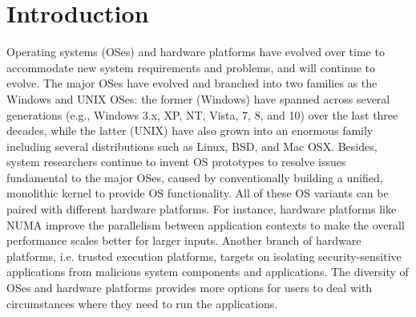 \chapter{Introduction}
\label{chap:intro}

\begin{comment}
Motivation:
-- A working operating system requires compatible applications to perform the operations demanded by the users.
-- The compatibility between an application and its operating system is determined by whether the required OS abstractions are faithfully supported.
-- In modern operating systems, applications can rely on plenty abstractions that exclusively belong to certain operating systems, thus the applications become hard to reuse on other platforms.
-- Application reuse is valuable for saving the cost of porting the demanded applications, especially on emerging, experimental operating systems. 
\end{comment}

Operating systems (OSes) and hardware platforms have evolved over time to accommodate new system requirements and problems, and will continue to evolve.
The major OSes have evolved and branched into two families as the Windows and UNIX OSes:
the former (Windows) have spanned across several generations
(e.g., Windows 3.x, XP, NT, Vista, 7, 8, and 10) over the last three decades,
while the latter (UNIX) have also grown into an enormous family including several distributions such as Linux, BSD, and Mac OSX.
Besides, system researchers continue to invent OS prototypes
to resolve issues fundamental to the major OSes, caused by conventionally building a unified, monolithic kernel to provide OS functionality.
All of these OS variants can be paired with different hardware platforms.
For instance, hardware platforms like NUMA improve the parallelism between application contexts to make the overall performance scales better for larger inputs.
Another branch of hardware platforms, i.e. trusted execution platforms,
targets on isolating security-sensitive applications from malicious system components and applications.
The diversity of OSes and hardware platforms provides more options for users to deal with circumstances where they need to run the applications.


